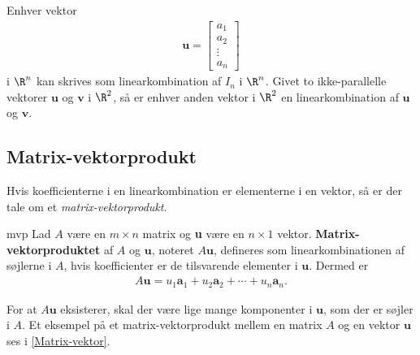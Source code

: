 %
%
Enhver vektor 
\begin{align*}
\textbf{u}=
\begin{bmatrix}
a_1 \\
a_2 \\
\vdots \\
a_n
\end{bmatrix}
\end{align*}
%
i $\R^n$ kan skrives som linearkombination af $I_n$ i $\R^n$. 
Givet to ikke-parallelle vektorer $\mathbf{u}$ og $\mathbf{v}$ i $\R^2$, så er enhver anden vektor i $\R^2$ en linearkombination af $\mathbf{u}$ og $\mathbf{v}$. 
%
\subsection{Matrix-vektorprodukt}
%
Hvis koefficienterne i en linearkombination er elementerne i en vektor, så er der tale om et \textit{matrix-vektorprodukt}.
%
%
\begin{defn}{}{mvp}
Lad $A$ være en $m \times n$ matrix og \textbf{u} være en $n \times 1$ vektor. 
\textbf{Matrix-vektorproduktet} af $A$ og $\textbf{u}$, noteret $A\textbf{u}$, defineres som linearkombinationen af søjlerne i $A$, hvis koefficienter er de tilsvarende elementer i $\textbf{u}$. 
Dermed er
%
\begin{align*}
A\textbf{u} =u_1\textbf{a}_1 + u_2\textbf{a}_2 + \cdots + u_n\textbf{a}_n.
\end{align*}
\end{defn}
\noindent
%
For at $A\textbf{u}$ eksisterer, skal der være lige mange komponenter i $\textbf{u}$, som der er søjler i $A$. 
Et eksempel på et matrix-vektorprodukt mellem en matrix $A$ og en vektor $\textbf{u}$ ses i \ref{Matrix-vektor}.
\\
%

